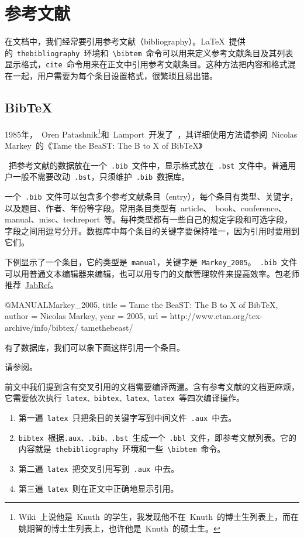 \section{参考文献}
在文档中，我们经常要引用参考文献（bibliography）。\LaTeX~提供的~\verb|thebibliography|~环境和~\verb|\bibtem|~命令可以用来定义参考文献条目及其列表显示格式，\verb|cite|~命令用来在正文中引用参考文献条目。这种方法把内容和格式混在一起，用户需要为每个条目设置格式，很繁琐且易出错。

\subsection{BibTeX}
1985年，~Oren Patashnik\footnote{Wiki~上说他是~Knuth~的学生，我发现他不在~Knuth~的博士生列表上，而在姚期智的博士生列表上，也许他是~Knuth~的硕士生。}和~Lamport~开发了~\BibTeX\citep{Patashnik_1988}，其详细使用方法请参阅~Nicolas Markey~的《Tame the BeaST: The B to X of BibTeX》\citep{Markey_2005}

\BibTeX~把参考文献的数据放在一个~\verb|.bib|~文件中，显示格式放在~\verb|.bst|~文件中。普通用户一般不需要改动~\verb|.bst|，只须维护~\verb|.bib|~数据库。

一个~\verb|.bib|~文件可以包含多个参考文献条目（entry），每个条目有类型、关键字，以及题目、作者、年份等字段。常用条目类型有~article、~book、conference、manual、misc、techreport~等。每种类型都有一些自己的规定字段和可选字段，字段之间用逗号分开。数据库中每个条目的关键字要保持唯一，因为引用时要用到它们。

下例显示了一个条目，它的类型是~\verb|manual|，关键字是~\verb|Markey_2005|。~\verb|.bib|~文件可以用普通文本编辑器来编辑，也可以用专门的文献管理软件来提高效率。包老师推荐~\href{http://jabref.sourceforge.net/}{JabRef}。

\begin{code}
@MANUAL{Markey_2005,
  title = {Tame the BeaST: The B to X of BibTeX},
  author = {Nicolas Markey},
  year = {2005},
  url = {http://www.ctan.org/tex-archive/info/bibtex/
    tamethebeast/}
}
\end{code}

有了数据库，我们可以象下面这样引用一个条目。
\begin{demo}
请参阅\cite{Markey_2005}。
\end{demo}

前文中我们提到含有交叉引用的文档需要编译两遍。含有参考文献的文档更麻烦，它需要依次执行~\verb|latex、bibtex、latex、latex|~等四次编译操作。

\begin{enumerate}
    \item 第一遍~\verb|latex|~只把条目的关键字写到中间文件~\verb|.aux|~中去。
    \item \verb|bibtex|~根据\verb|.aux、.bib、.bst|~生成一个~\verb|.bbl|~文件，即参考文献列表。它的内容就是~\verb|thebibliography|~环境和一些~\verb|\bibtem|~命令。
    \item 第二遍~\verb|latex|~把交叉引用写到~\verb|.aux|~中去。
    \item 第三遍~\verb|latex|~则在正文中正确地显示引用。
\end{enumerate}

